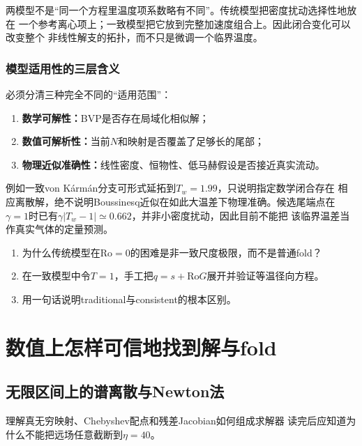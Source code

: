 \documentclass[UTF8,zihao=-4,openany]{ctexbook}
\newcommand{\Ro}{\mathrm{Ro}}
\begin{document}
\begin{keyresult}
两模型不是“同一个方程里温度项系数略有不同”。传统模型把密度扰动选择性地放在
一个参考离心项上；一致模型把它放到完整加速度组合上。因此闭合变化可以改变整个
非线性解支的拓扑，而不只是微调一个临界温度。
\end{keyresult}

\section{模型适用性的三层含义}

必须分清三种完全不同的“适用范围”：

\begin{enumerate}
  \item \textbf{数学可解性：}BVP是否存在局域化相似解；
  \item \textbf{数值可解析性：}当前$N$和映射是否覆盖了足够长的尾部；
  \item \textbf{物理近似准确性：}线性密度、恒物性、低马赫假设是否接近真实流动。
\end{enumerate}
例如一致von K\'arm\'an分支可形式延拓到$T_w=1.99$，只说明指定数学闭合存在
相应离散解，绝不说明Boussinesq近似在如此大温差下物理准确。候选尾端点在
$\gamma=1$时已有$\gamma|T_w-1|\simeq0.662$，并非小密度扰动，因此目前不能把
该临界温差当作真实气体的定量预测。

\enlargethispage{6\baselineskip}
\begin{checkpoint}
\begin{enumerate}
  \item 为什么传统模型在$\Ro=0$的困难是非一致尺度极限，而不是普通fold？
  \item 在一致模型中令$T=1$，手工把$q=s+\Ro G$展开并验证等温径向方程。
  \item 用一句话说明traditional与consistent的根本区别。
\end{enumerate}
\end{checkpoint}

\part{数值上怎样可信地找到解与fold}

\chapter{无限区间上的谱离散与Newton法}\label{ch:numerics}

\begin{learninggoal}{理解真无穷映射、Chebyshev配点和残差Jacobian如何组成求解器}
读完后应知道为什么不能把远场任意截断到$\eta=40$。
\end{learninggoal}
\end{document}
